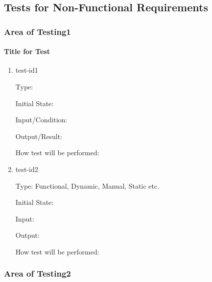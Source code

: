 \documentclass[12pt, titlepage]{article}
\begin{document}

\subsection{Tests for Non-Functional Requirements}

\subsubsection{Area of Testing1}
		
\paragraph{Title for Test}

\begin{enumerate}

\item{test-id1\\}

Type: 
					
Initial State: 
					
Input/Condition: 
					
Output/Result: 
					
How test will be performed: 
					
\item{test-id2\\}

Type: Functional, Dynamic, Manual, Static etc.
					
Initial State: 
					
Input: 
					
Output: 
					
How test will be performed: 

\end{enumerate}

\subsubsection{Area of Testing2}
\end{document}
